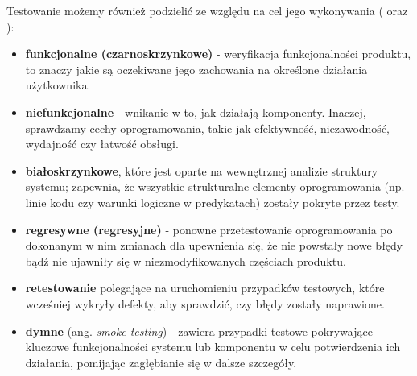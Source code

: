 \noindent Testowanie możemy również podzielić ze względu na cel jego wykonywania (\cite{roman} oraz \cite{smiglin}):
\begin{itemize}
    \item \textbf{funkcjonalne (czarnoskrzynkowe)} - weryfikacja funkcjonalności produktu, to znaczy jakie są oczekiwane jego zachowania na określone działania użytkownika.
    \item \textbf{niefunkcjonalne} - wnikanie w to, jak działają komponenty. Inaczej, sprawdzamy cechy oprogramowania, takie jak efektywność, niezawodność, wydajność czy łatwość obsługi. 
    \item \textbf{białoskrzynkowe}, które jest oparte na wewnętrznej analizie struktury systemu; zapewnia, że wszystkie strukturalne elementy oprogramowania (np. linie kodu czy warunki logiczne w predykatach) zostały pokryte przez testy.
    \item \textbf{regresywne (regresyjne)} - ponowne przetestowanie oprogramowania  po dokonanym w nim zmianach dla upewnienia się, że nie powstały nowe błędy bądź nie ujawniły się w niezmodyfikowanych częściach produktu.
    \item \textbf{retestowanie} polegające na uruchomieniu przypadków testowych, które wcześniej wykryły defekty, aby sprawdzić, czy błędy zostały naprawione.
    \item \textbf{dymne} (ang. \textit{smoke testing}) - zawiera przypadki testowe pokrywające kluczowe funkcjonalności systemu lub komponentu w celu potwierdzenia ich działania, pomijając zagłębianie się w dalsze szczegóły.
\end{itemize}



